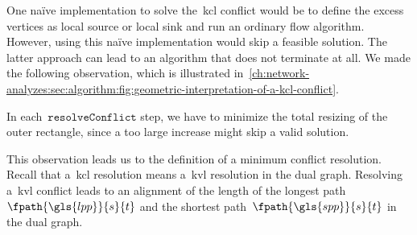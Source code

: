 One na{\"i}ve implementation to solve the~\gls{kcl} conflict would be to define
the excess vertices as local source or local sink and run an ordinary flow
algorithm. However, using this na{\"i}ve implementation would skip a feasible
solution. The latter approach can lead to an algorithm that does not terminate
at all. We made the following observation, which is illustrated
in~\cref{ch:network-analyzes:sec:algorithm:fig:geometric-interpretation-of-a-kcl-conflict}.
% 
\begin{observation}
    In each~$\texttt{resolveConflict}$ step, we have to minimize the total
    resizing of the outer rectangle, since a too large increase might skip a
    valid solution.
    \label{ch:network-analyzes:sec:mathematical-model:obs:resolve-kcl-conflict}
\end{observation}
% 
This observation leads us to the definition of a minimum conflict resolution.
Recall that a~\gls{kcl} resolution means a~\gls{kvl} resolution in the dual
graph. Resolving a~\gls{kvl} conflict leads to an alignment of the length of the
longest path~$\fpath{\gls{lpp}}{\source}{\sink}$ and the shortest
path~$\fpath{\gls{spp}}{\source} {\sink}$ in the dual graph.
% 
%
